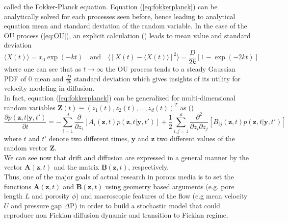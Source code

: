 called the Fokker-Planck equation. Equation (\ref{eq:fokkerplanck}) can be analytically solved for each processes seen before, hence leading to analytical equation mean and standard deviation of the random variable. In the case of the OU process (\ref{eq:OU}), an explicit calculation (\cite[Sec. 3.8.4]{Gardiner1996}) leads to mean value and standard deviation
\[
\langle X(t)\rangle=x_0 \exp(-kt) \quad\textrm{and}\quad \langle[X(t)-\langle X(t)\rangle]^2\rangle=\frac{D}{2k}[1-\exp(-2kt)]
\]
where one can see that as $t\rightarrow\infty$ the OU process tends to a steady Gaussian PDF of $0$ mean and $\frac{D}{2k}$ standard deviation which gives insights of its utility for velocity modeling in diffusion. \\
In fact, equation (\ref{eq:fokkerplanck}) can be generalized for multi-dimensional random variables $\textbf{Z}(t)\equiv(z_1(t),z_2(t),...,z_d(t))^T$ as (\citet[Sec. 3.5.2]{Gardiner1996}) 
\begin{equation}
\frac{\partial p(\textbf{z},t|\textbf{y},t')}{\partial t} =
-\sum_{i=1}^d\frac{\partial}{\partial z_i}[A_i(\textbf{z},t)p(\textbf{z},t|\textbf{y},t')]
+ \frac{1}{2}\sum_{i,j=1}^d\frac{\partial^2 }{\partial z_i \partial z_j}[B_{ij}(\textbf{z},t)p(\textbf{z},t|\textbf{y},t')]
\label{eq:mdfp}
\end{equation}
where $t$ and $t'$ denote two different times, $\textbf{y}$ and $\textbf{z}$ two different values of the random vector $\textbf{Z}$.\\ 
We can see now that drift and diffusion are expressed in a general manner by the vector $\textbf{A}(\textbf{z},t)$ and the matrix $\underline{\textbf{B}}(\textbf{z},t)$, respectively.\\
Thus, one of the major goals of actual research in porous media is to set the functions $\textbf{A}(\textbf{z},t)$ and $\underline{\textbf{B}}(\textbf{z},t)$ using geometry based arguments (e.g. pore length $L$ and porosity $\phi$) and macroscopic features of the flow (e.g mean velocity $U$ and pressure gap $\Delta\textrm{P}$) in order to build a stochastic model that could reproduce non Fickian diffusion dynamic and transition to Fickian regime.\\

